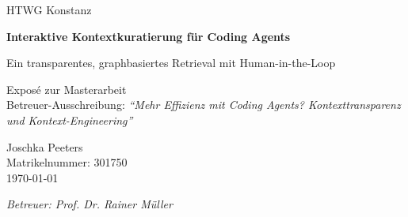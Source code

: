 \documentclass[12pt,a4paper]{scrartcl}
\begin{document}
\begin{titlepage}
  \centering

  \large{HTWG Konstanz}

  \vfill

  {\LARGE\bfseries Interaktive Kontextkuratierung für Coding Agents\par}

  \vspace{0.6cm}

  {\large Ein transparentes, graphbasiertes Retrieval mit Human-in-the-Loop\par}

  \vspace{1.2cm}

  {\large Exposé zur Masterarbeit}\\[0.4em]
  {\normalsize Betreuer-Ausschreibung: \textit{\enquote{Mehr Effizienz mit Coding Agents? Kontexttransparenz und Kontext-Engineering}}}

  \vspace{2cm}

  {\large Joschka Peeters}\\[0.5em]
  {\normalsize Matrikelnummer: 301750}\\[0.5em]
  {\normalsize \today}

  \vfill

  \textit{Betreuer: Prof. Dr. Rainer Müller}

\end{titlepage}

\tableofcontents
\newpage






\newpage
\printbibliography[heading=bibintoc, title={Literaturverzeichnis}]
\end{document}
